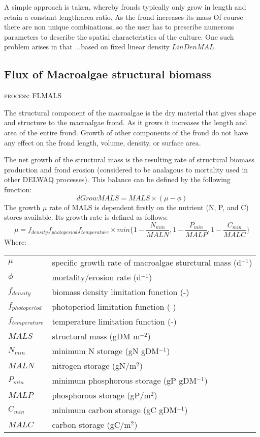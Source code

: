 \documentclass{deltares_manual}
\begin{document}
A simple approach is taken, whereby fronds typically only grow in length and retain a constant length:area ratio. As the frond increases its mass Of course there are non unique combinations, so the user has to prescribe numerous parameters to describe the spatial characteristics of the culture. One such problem arises in that ...based on fixed linear density $LinDenMAL$.  

\subsection{Flux of Macroalgae structural biomass}
\begin{flushright}
\textsc{process: FLMALS}
\end{flushright}

The structural component of the macroalgae is the dry material that gives shape and structure to the macroalgae frond. As it grows it increases the length and area of the entire frond. Growth of other components of the frond do not have any effect on the frond length, volume, density, or surface area. 

The net growth of the structural mass is the resulting rate of structural biomass production and frond erosion (considered to be analagous to mortality used in other DELWAQ processes). This balance can be defined by the following function:
\[dGrowMALS =MALS \times (\mu - \phi)\]
The growth $\mu$ rate of MALS is dependent firstly on the nutrient (N, P, and C) stores available. Its growth rate is defined as follows:
\[\mu = f_{density} f_{photoperiod} f_{temperature}\times min\big\{1-\frac{N_{min}}{MALN},1-\frac{P_{min}}{MALP},1-\frac{C_{min}}{MALC}\big\}\]
Where:\\
\begin{tabular}{ll}
$\mu$  & specific growth rate of macroalgae sturctural mass (d$^{-1}$) \\
$\phi$ & mortality/erosion rate (d$^{-1}$) \\
$f_{density}$ & biomass density limitation function (-)\\
$f_{photoperiod}$ & photoperiod limitation function (-)\\
$f_{temperature}$ & temperature limitation function (-)\\
$MALS$ & structural mass (gDM m$^{-2}$)\\
$N_{min}$ & minimum N storage (gN gDM$^{-1}$)\\
$MALN$ & nitrogen storage (gN/m$^2$)\\
$P_{min}$ & minimum phosphorous storage (gP gDM$^{-1}$)\\
$MALP$ & phosphorous storage (gP/m$^2$)\\
$C_{min}$ & minimum carbon storage (gC gDM$^{-1}$)\\
$MALC$ & carbon storage (gC/m$^2$)\\
\end{tabular}
\end{document}
